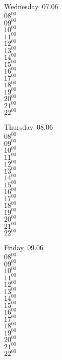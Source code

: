 \documentclass[11pt,a4paper]{book}\usepackage[]{graphicx}\usepackage[]{color}
\begin{document}
\begin{weekdaybox}
  Wednesday~07.06\\
  { 
  \vfill
  $08^{00}$\\
$09^{00}$\\
$10^{00}$\\
$11^{00}$\\
$12^{00}$\\
$13^{00}$\\
$14^{00}$\\
$15^{00}$\\
$16^{00}$\\
$17^{00}$\\
$18^{00}$\\
$19^{00}$\\
$20^{00}$\\
$21^{00}$\\
$22^{00}$\\
  }
\end{weekdaybox}
\clearpage
\begin{headerbox}
\end{headerbox}
\begin{weekdaybox}
  Thursday~08.06\\
  { 
  \vfill
  $08^{00}$\\
$09^{00}$\\
$10^{00}$\\
$11^{00}$\\
$12^{00}$\\
$13^{00}$\\
$14^{00}$\\
$15^{00}$\\
$16^{00}$\\
$17^{00}$\\
$18^{00}$\\
$19^{00}$\\
$20^{00}$\\
$21^{00}$\\
$22^{00}$\\
  }
\end{weekdaybox} 
\begin{weekdaybox}
  Friday~09.06\\
  { 
  \vfill
  $08^{00}$\\
$09^{00}$\\
$10^{00}$\\
$11^{00}$\\
$12^{00}$\\
$13^{00}$\\
$14^{00}$\\
$15^{00}$\\
$16^{00}$\\
$17^{00}$\\
$18^{00}$\\
$19^{00}$\\
$20^{00}$\\
$21^{00}$\\
$22^{00}$\\
  }
\end{weekdaybox}
\end{document}
